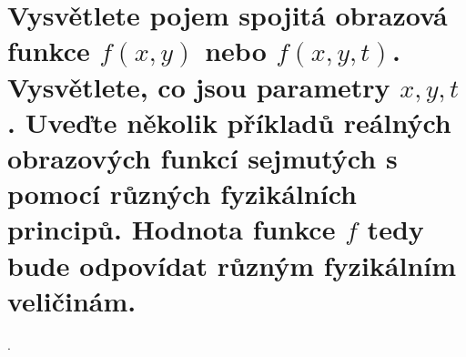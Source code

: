\section{Vysvětlete pojem spojitá obrazová funkce \texorpdfstring{$f (x, y)$}{f (x, y)} nebo 
\texorpdfstring{$f (x, y, t)$}{f (x, y, t)}. Vysvětlete, co jsou parametry \texorpdfstring{$x, y, t$}{x, y, t}. Uveďte 
několik příkladů reálných obrazových funkcí sejmutých s pomocí různých fyzikálních principů. Hodnota funkce 
\texorpdfstring{$f$}{f} tedy bude odpovídat různým fyzikálním veličinám.}.